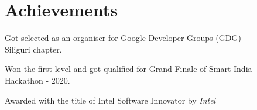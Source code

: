 \documentclass[letterpaper]{deedy-resume} %
\begin{document}
\begin{minipage}[t]{0.66\textwidth}
\begin{tightitemize}
\end{tightitemize}

\sectionspace %
\sectionspace



\sectionspace %
\sectionspace









\section{Achievements } 
\sectionspace

\begin{tightitemize}
\item Got selected as an organiser for Google Developer Groups (GDG) \\      Siliguri chapter.
\item Won the first level and got qualified for Grand Finale of Smart India \\ Hackathon - 2020.
\item Awarded with the title of Intel Software Innovator by \textit{Intel}

\end{tightitemize}

\sectionspace %



\end{minipage}
\end{document}
